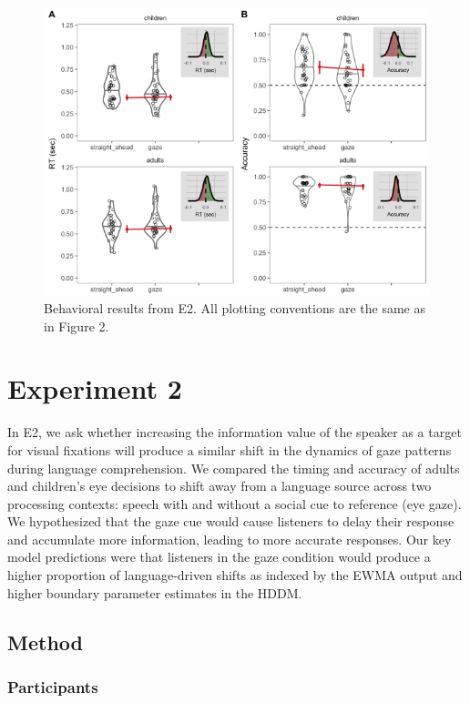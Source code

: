 \documentclass[10pt, letterpaper]{article}
\newenvironment{CodeChunk}{}{}
\begin{document}
\begin{CodeChunk}
\begin{figure}[tb]

{\centering \includegraphics[width=0.7\linewidth]{figs/gaze_acc_rt_e2_plot-1} 

}

\caption[Behavioral results from E2]{Behavioral results from E2. All plotting conventions are the same as in Figure 2.}\label{fig:gaze_acc_rt_e2_plot}
\end{figure}
\end{CodeChunk}

\section{Experiment 2}\label{experiment-2}

In E2, we ask whether increasing the information value of the speaker as
a target for visual fixations will produce a similar shift in the
dynamics of gaze patterns during language comprehension. We compared the
timing and accuracy of adults and children's eye decisions to shift away
from a language source across two processing contexts: speech with and
without a social cue to reference (eye gaze). We hypothesized that the
gaze cue would cause listeners to delay their response and accumulate
more information, leading to more accurate responses. Our key model
predictions were that listeners in the gaze condition would produce a
higher proportion of language-driven shifts as indexed by the EWMA
output and higher boundary parameter estimates in the HDDM.

\subsection{Method}\label{method-1}

\subsubsection{Participants}\label{participants-1}
\end{document}
